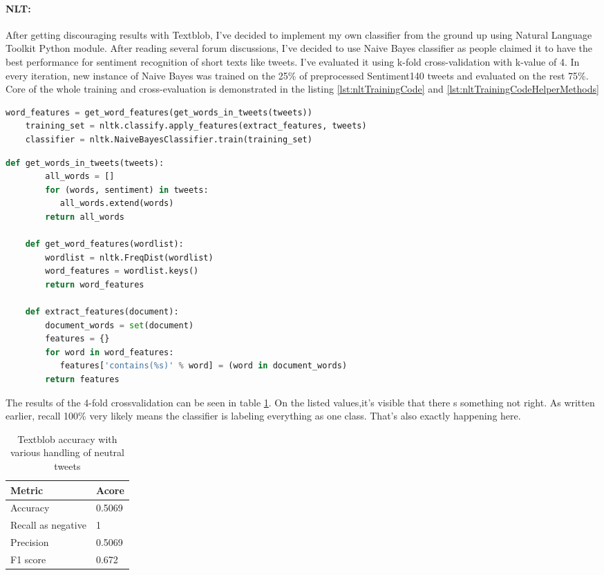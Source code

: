 \paragraph{NLT:} After getting discouraging results with Textblob, I've decided to implement my own classifier from the ground up using Natural Language Toolkit Python module. After reading several forum discussions, I've decided to use Naive Bayes classifier as people claimed it to have the best performance for sentiment recognition of short texts like tweets. I've evaluated it using k-fold cross-validation with k-value of 4. In every iteration, new instance of Naive Bayes was trained on the 25\% of preprocessed Sentiment140 tweets and evaluated on the rest 75\%. Core of the whole training and cross-evaluation is demonstrated in the listing \ref{lst:nltTrainingCode} and \ref{lst:nltTrainingCodeHelperMethods}

\begin{lstlisting}[caption={Feature extraction and NLT classifier training},label={lst:nltTrainingCode},language=Python]
    word_features = get_word_features(get_words_in_tweets(tweets))
    training_set = nltk.classify.apply_features(extract_features, tweets)
    classifier = nltk.NaiveBayesClassifier.train(training_set)
\end{lstlisting}    
\begin{lstlisting}[caption={Helper methods for text features extraction},label={lst:nltTrainingCodeHelperMethods},language=Python]
    def get_words_in_tweets(tweets):
    	all_words = []
    	for (words, sentiment) in tweets:
           all_words.extend(words)
    	return all_words    
    
    def get_word_features(wordlist):
    	wordlist = nltk.FreqDist(wordlist)
    	word_features = wordlist.keys()
    	return word_features

    def extract_features(document):
    	document_words = set(document)
    	features = {}
    	for word in word_features:
           features['contains(%s)' % word] = (word in document_words)
    	return features
\end{lstlisting}

The results of the 4-fold crossvalidation can be seen in table \ref{table:NLTmetrics}. On the listed values,it's visible that there
s something not right. As written earlier, recall 100\% very likely means the classifier is labeling everything as one class. That's also exactly happening here.

\begin{table}[H]
\centering
\begin{tabular}{ |p{3cm}||p{3cm}|}
 \hline
\textbf{ Metric }& \textbf{Acore}\\
 \hline
 Accuracy   & 0.5069\\ \hline
 Recall as negative & 1\\ \hline
 Precision & 0.5069\\ \hline 
 F1 score & 0.672\\ \hline 
\end{tabular}
\caption{Textblob accuracy with various handling of neutral tweets}
\label{table:NLTmetrics}
\end{table}

